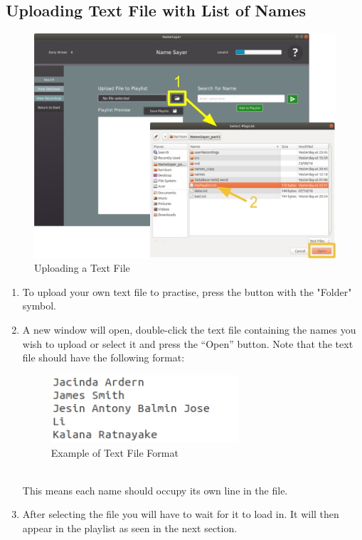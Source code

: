 \documentclass[a4paper,12pt]{article}
\begin{document}
\subsection{Uploading Text File with List of Names}
\begin{figure}[!h]
	\includegraphics[width=\linewidth]{upload.png}
	\caption{Uploading a Text File}
\end{figure}

\begin{enumerate}[label=\textbf{\arabic*}]
	\item To upload your own text file to practise, press the button with the "Folder" symbol.
	
	\item A new window will open, double-click the text file containing the names you wish to upload or select it and press the “Open” button. Note that the text file should have the following format:
	\begin{figure}[!h]
		\centering
		\includegraphics[width=7cm]{textfile.png}
		\caption{Example of Text File Format}
	\end{figure}
	\\
	This means each name should occupy its own line in the file.

	
	\item After selecting the file you will have to wait for it to load in. It will then appear in the playlist as seen in the next section.
	
\end{enumerate}
\newpage
\end{document}

